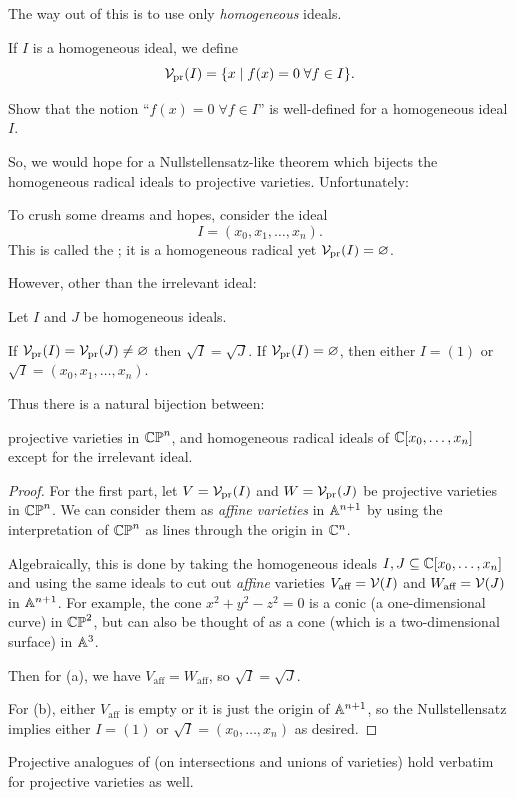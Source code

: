 The way out of this is to use only \emph{homogeneous} ideals.
\begin{definition}
	If $I$ is a homogeneous ideal, we define
	\[ \mathcal V_{\text{pr}}(I) = \{ x \mid f(x) = 0 \; \forall f \in I\}. \]
\end{definition}
\begin{exercise}
	Show that the notion ``$f(x) = 0 \; \forall f \in I$''
	is well-defined for a homogeneous ideal $I$.
\end{exercise}
So, we would hope for a Nullstellensatz-like theorem
which bijects the homogeneous radical ideals to projective varieties.
Unfortunately:
\begin{example}
	To crush some dreams and hopes, consider the ideal
	\[ I = (x_0, x_1, \dots, x_n). \]
	This is called the ;
	it is a homogeneous radical yet $\mathcal V_{\text{pr}}(I) = \varnothing$.
\end{example}

However, other than the irrelevant ideal:
\begin{theorem}
	Let $I$ and $J$ be homogeneous ideals.
	\begin{enumerate}[(a)]
		\ii If $\mathcal V_{\text{pr}}(I) = \mathcal V_{\text{pr}}(J) \neq \varnothing$ then $\sqrt I = \sqrt J$.
		\ii If $\mathcal V_{\text{pr}}(I) = \varnothing$, then either $I = (1)$
		or $\sqrt I = (x_0, x_1, \dots, x_n)$.
	\end{enumerate}
	Thus there is a natural bijection between:
	\begin{itemize}
		\ii projective varieties in $\mathbb{CP}^n$, and
		\ii homogeneous radical ideals of $\mathbb C[x_0, \dots, x_n]$
		except for the irrelevant ideal.
	\end{itemize}
\end{theorem}
\begin{proof}
	For the first part, let $V = \mathcal V_{\text{pr}}(I)$ and $W = \mathcal V_{\text{pr}}(J)$
	be projective varieties in $\mathbb{CP}^n$.
	We can consider them as \emph{affine varieties} in $\mathbb A^{n+1}$
	by using the interpretation of $\mathbb{CP}^n$
	as lines through the origin in $\mathbb C^n$.

	Algebraically, this is done by taking the homogeneous ideals
	$I, J \subseteq \mathbb C[x_0, \dots, x_n]$
	and using the same ideals to cut out \emph{affine} varieties
	$V_{\text{aff}} = \mathcal V(I)$ and $W_{\text{aff}} = \mathcal V(J)$ in $\mathbb A^{n+1}$.
	For example, the cone $x^2+y^2-z^2=0$ is a conic (a one-dimensional curve)
	in $\mathbb{CP}^2$, but can also be thought of as a cone
	(which is a two-dimensional surface) in $\mathbb A^3$.

	Then for (a), we have $V_{\text{aff}} = W_{\text{aff}}$,
	so $\sqrt I = \sqrt J$.

	For (b), either $V_{\text{aff}}$ is empty
	or it is just the origin of $\mathbb A^{n+1}$,
	so the Nullstellensatz implies either $I = (1)$
	or $\sqrt I = (x_0, \dots, x_n)$ as desired.
\end{proof}
Projective analogues of 
(on intersections and unions of varieties) hold verbatim
for projective varieties as well.


